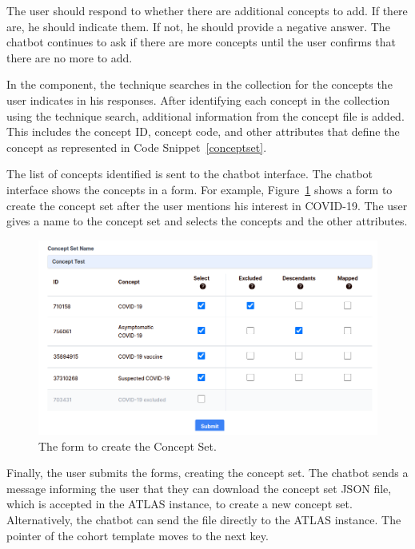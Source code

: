 The user should respond to whether there are additional concepts to add. If there are, he should indicate them. If not, he should provide a negative answer. The chatbot continues to ask if there are more concepts until the user confirms that there are no more to add.

In the {\ir} component, the {\bm} technique searches in the collection for the concepts the user indicates in his responses. After identifying each concept in the collection using the {\ir} technique search, additional information from the concept file is added. This includes the concept ID, concept code, and other attributes that define the concept as represented in Code Snippet~\ref{conceptset}.

The list of concepts identified is sent to the chatbot interface. The chatbot interface shows the concepts in a form. For example, Figure~\ref{fig_forms} shows a form to create the concept set after the user mentions his interest in COVID-19. The user gives a name to the concept set and selects the concepts and the other attributes.


\begin{figure}[H]
  \includegraphics[width=1\textwidth]{figs/chapter4/form.png}
  \centering
  \caption[The form to create the concept set]{The form to create the Concept Set.}
  \label{fig_forms}
\end{figure}


Finally, the user submits the forms, creating the concept set. The chatbot sends a message informing the user that they can download the concept set JSON file, which is accepted in the ATLAS instance, to create a new concept set. Alternatively, the chatbot can send the file directly to the ATLAS instance. The pointer of the cohort template moves to the next key.



